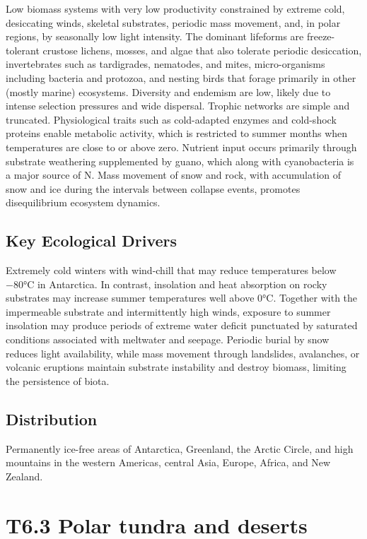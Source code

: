 \documentclass[
  letterpaper,
  DIV=11,
  numbers=noendperiod]{scrartcl}
\begin{document}
Low biomass systems with very low productivity constrained by extreme
cold, desiccating winds, skeletal substrates, periodic mass movement,
and, in polar regions, by seasonally low light intensity. The dominant
lifeforms are freeze-tolerant crustose lichens, mosses, and algae that
also tolerate periodic desiccation, invertebrates such as tardigrades,
nematodes, and mites, micro-organisms including bacteria and protozoa,
and nesting birds that forage primarily in other (mostly marine)
ecosystems. Diversity and endemism are low, likely due to intense
selection pressures and wide dispersal. Trophic networks are simple and
truncated. Physiological traits such as cold-adapted enzymes and
cold-shock proteins enable metabolic activity, which is restricted to
summer months when temperatures are close to or above zero. Nutrient
input occurs primarily through substrate weathering supplemented by
guano, which along with cyanobacteria is a major source of N. Mass
movement of snow and rock, with accumulation of snow and ice during the
intervals between collapse events, promotes disequilibrium ecosystem
dynamics.

\subsection{Key Ecological Drivers}\label{key-ecological-drivers-94}

Extremely cold winters with wind-chill that may reduce temperatures
below −80°C in Antarctica. In contrast, insolation and heat absorption
on rocky substrates may increase summer temperatures well above 0°C.
Together with the impermeable substrate and intermittently high winds,
exposure to summer insolation may produce periods of extreme water
deficit punctuated by saturated conditions associated with meltwater and
seepage. Periodic burial by snow reduces light availability, while mass
movement through landslides, avalanches, or volcanic eruptions maintain
substrate instability and destroy biomass, limiting the persistence of
biota.

\subsection{Distribution}\label{distribution-94}

Permanently ice-free areas of Antarctica, Greenland, the Arctic Circle,
and high mountains in the western Americas, central Asia, Europe,
Africa, and New Zealand.

\section{T6.3 Polar tundra and
deserts}\label{t6.3-polar-tundra-and-deserts}
\end{document}
